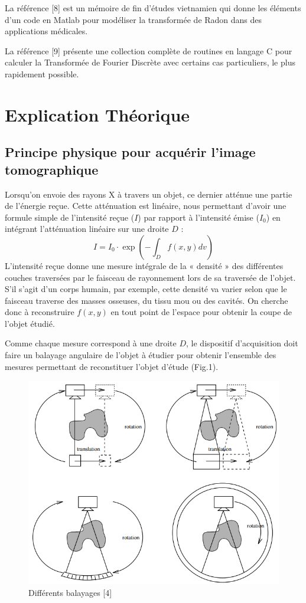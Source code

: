 \documentclass[conference]{IEEEtran}
\begin{document}
La référence [8] est un mémoire de fin d’études vietnamien qui donne les éléments d’un code en Matlab pour modéliser la transformée de Radon dans des applications médicales.
 
La référence [9] présente une collection complète de routines en langage C pour calculer la Transformée de Fourier Discrète avec certains cas particuliers, le plus rapidement possible.

\section{Explication Théorique}

\subsection{Principe physique pour acquérir l'image tomographique}

Lorsqu'on envoie des rayons X à travers un objet, ce dernier atténue une partie de l'énergie reçue.  Cette atténuation est linéaire, nous permettant d'avoir une formule simple de l'intensité reçue ($I$) par rapport à l'intensité émise ($I_0$) en intégrant l'atténuation linéaire sur une droite $D$ : \[
I=I_0 \cdot \exp(- \int_{D} f(x,y) dv )
\]
L’intensité reçue donne une mesure intégrale de la « densité » des différentes couches traversées par le faisceau de rayonnement lors de sa traversée de l’objet. S’il s’agit d’un corps humain, par exemple, cette densité va varier selon que le faisceau traverse des masses osseuses, du tissu mou ou des cavités.
On cherche donc à reconstruire $f(x,y)$ en tout point de l’espace pour obtenir la coupe de l’objet étudié.

Comme chaque mesure correspond à une droite $D$, le dispositif d'acquisition doit faire un balayage angulaire de l'objet à étudier pour obtenir l'ensemble des mesures permettant de reconstituer l'objet d'étude (Fig.1).

\begin{figure}[H]
\centering
\includegraphics[scale=0.4]{Balayage}
\caption[Balayage]{Différents balayages [4]}
\label{fig:gallery}
\end{figure}
\end{document}
